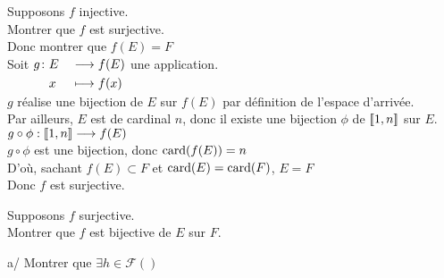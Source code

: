 \documentclass[12pt,twoside,a4paper]{article}
\begin{document}
	\begin{preuve}
		\begin{liste}
			\item[\cercle1]Supposons $f$ injective.\\
				Montrer que $f$ est surjective.\\
				Donc montrer que $f(E)=F$\\
				Soit $\begin{aligned}[t]g\colon&E&&\longrightarrow f(E) \\&x&&\longmapsto f(x)\end{aligned}$ une application.\\
				$g$ réalise une bijection de $E$ sur $f(E)$ par définition de l'espace d'arrivée.\\
				Par ailleurs, $E$ est de cardinal $n$, donc il existe une bijection $\phi$ de $[\![ 1,n]\!]$ sur $E$.\\
				$g\circ \phi:[\![ 1,n]\!]\longrightarrow f(E)$\\
				$g\circ\phi$ est une bijection, donc $\text{card}(f(E))=n$\\
				D'o\`u, sachant $f(E)\subset F$ et $\text{card}(E)=\text{card}(F)$, $E=F$\\
				Donc $f$ est surjective.
			\item[\cercle2]Supposons $f$ surjective.\\
				Montrer que $f$ est bijective de $E$ sur $F$.
				\begin{liste}
					\item[a/] Montrer que $\exists h\in\mathcal{F}()$
				\end{liste}
		\end{liste}
	\end{preuve}
\end{document}

